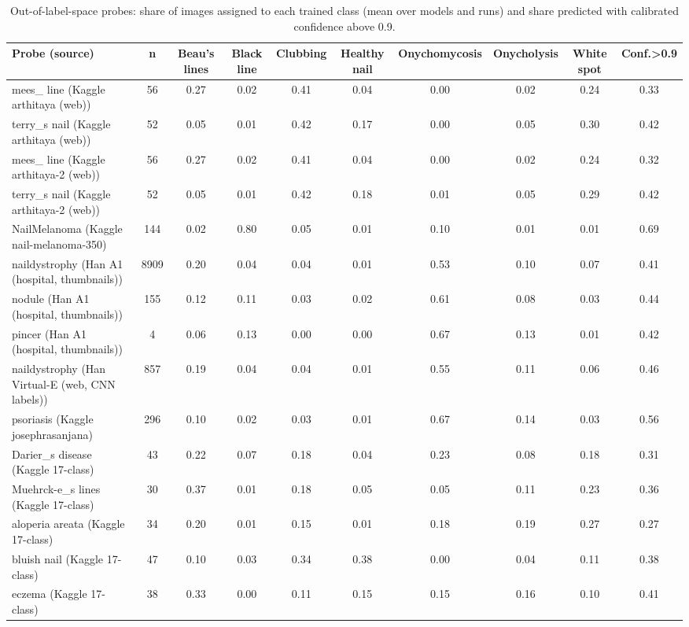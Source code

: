 \begin{table}[!tbp]
\centering
\caption{Out-of-label-space probes: share of images assigned to each trained class (mean over models and runs) and share predicted with calibrated confidence above 0.9.}
\label{tab:probes}
\footnotesize
\begin{tabular}{lccccccccc}
\hline
Probe (source) & n & Beau's lines & Black line & Clubbing & Healthy nail & Onychomycosis & Onycholysis & White spot & Conf.>0.9 \\
\hline
mees\_ line (Kaggle arthitaya (web)) & 56 & 0.27 & 0.02 & 0.41 & 0.04 & 0.00 & 0.02 & 0.24 & 0.33 \\
terry\_s nail (Kaggle arthitaya (web)) & 52 & 0.05 & 0.01 & 0.42 & 0.17 & 0.00 & 0.05 & 0.30 & 0.42 \\
mees\_ line (Kaggle arthitaya-2 (web)) & 56 & 0.27 & 0.02 & 0.41 & 0.04 & 0.00 & 0.02 & 0.24 & 0.32 \\
terry\_s nail (Kaggle arthitaya-2 (web)) & 52 & 0.05 & 0.01 & 0.42 & 0.18 & 0.01 & 0.05 & 0.29 & 0.42 \\
NailMelanoma (Kaggle nail-melanoma-350) & 144 & 0.02 & 0.80 & 0.05 & 0.01 & 0.10 & 0.01 & 0.01 & 0.69 \\
naildystrophy (Han A1 (hospital, thumbnails)) & 8909 & 0.20 & 0.04 & 0.04 & 0.01 & 0.53 & 0.10 & 0.07 & 0.41 \\
nodule (Han A1 (hospital, thumbnails)) & 155 & 0.12 & 0.11 & 0.03 & 0.02 & 0.61 & 0.08 & 0.03 & 0.44 \\
pincer (Han A1 (hospital, thumbnails)) & 4 & 0.06 & 0.13 & 0.00 & 0.00 & 0.67 & 0.13 & 0.01 & 0.42 \\
naildystrophy (Han Virtual-E (web, CNN labels)) & 857 & 0.19 & 0.04 & 0.04 & 0.01 & 0.55 & 0.11 & 0.06 & 0.46 \\
psoriasis (Kaggle josephrasanjana) & 296 & 0.10 & 0.02 & 0.03 & 0.01 & 0.67 & 0.14 & 0.03 & 0.56 \\
Darier\_s disease (Kaggle 17-class) & 43 & 0.22 & 0.07 & 0.18 & 0.04 & 0.23 & 0.08 & 0.18 & 0.31 \\
Muehrck-e\_s lines (Kaggle 17-class) & 30 & 0.37 & 0.01 & 0.18 & 0.05 & 0.05 & 0.11 & 0.23 & 0.36 \\
aloperia areata (Kaggle 17-class) & 34 & 0.20 & 0.01 & 0.15 & 0.01 & 0.18 & 0.19 & 0.27 & 0.27 \\
bluish nail (Kaggle 17-class) & 47 & 0.10 & 0.03 & 0.34 & 0.38 & 0.00 & 0.04 & 0.11 & 0.38 \\
eczema (Kaggle 17-class) & 38 & 0.33 & 0.00 & 0.11 & 0.15 & 0.15 & 0.16 & 0.10 & 0.41 \\

\end{tabular}
\end{table}
